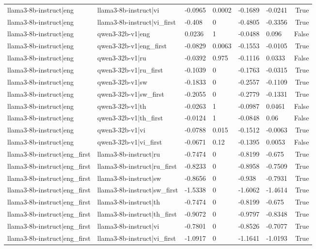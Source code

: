 \begin{table}
\begin{tabular}{llllllr}
llama3-8b-instruct|eng & llama3-8b-instruct|vi & -0.0965 & 0.0002 & -0.1689 & -0.0241 & True \\
llama3-8b-instruct|eng & llama3-8b-instruct|vi_first & -0.408 & 0 & -0.4805 & -0.3356 & True \\
llama3-8b-instruct|eng & qwen3-32b-v1|eng & 0.0236 & 1 & -0.0488 & 0.096 & False \\
llama3-8b-instruct|eng & qwen3-32b-v1|eng_first & -0.0829 & 0.0063 & -0.1553 & -0.0105 & True \\
llama3-8b-instruct|eng & qwen3-32b-v1|ru & -0.0392 & 0.975 & -0.1116 & 0.0333 & False \\
llama3-8b-instruct|eng & qwen3-32b-v1|ru_first & -0.1039 & 0 & -0.1763 & -0.0315 & True \\
llama3-8b-instruct|eng & qwen3-32b-v1|sw & -0.1833 & 0 & -0.2557 & -0.1109 & True \\
llama3-8b-instruct|eng & qwen3-32b-v1|sw_first & -0.2055 & 0 & -0.2779 & -0.1331 & True \\
llama3-8b-instruct|eng & qwen3-32b-v1|th & -0.0263 & 1 & -0.0987 & 0.0461 & False \\
llama3-8b-instruct|eng & qwen3-32b-v1|th_first & -0.0124 & 1 & -0.0848 & 0.06 & False \\
llama3-8b-instruct|eng & qwen3-32b-v1|vi & -0.0788 & 0.015 & -0.1512 & -0.0063 & True \\
llama3-8b-instruct|eng & qwen3-32b-v1|vi_first & -0.0671 & 0.12 & -0.1395 & 0.0053 & False \\
llama3-8b-instruct|eng_first & llama3-8b-instruct|ru & -0.7474 & 0 & -0.8199 & -0.675 & True \\
llama3-8b-instruct|eng_first & llama3-8b-instruct|ru_first & -0.8233 & 0 & -0.8958 & -0.7509 & True \\
llama3-8b-instruct|eng_first & llama3-8b-instruct|sw & -0.8656 & 0 & -0.938 & -0.7931 & True \\
llama3-8b-instruct|eng_first & llama3-8b-instruct|sw_first & -1.5338 & 0 & -1.6062 & -1.4614 & True \\
llama3-8b-instruct|eng_first & llama3-8b-instruct|th & -0.7474 & 0 & -0.8199 & -0.675 & True \\
llama3-8b-instruct|eng_first & llama3-8b-instruct|th_first & -0.9072 & 0 & -0.9797 & -0.8348 & True \\
llama3-8b-instruct|eng_first & llama3-8b-instruct|vi & -0.7801 & 0 & -0.8526 & -0.7077 & True \\
llama3-8b-instruct|eng_first & llama3-8b-instruct|vi_first & -1.0917 & 0 & -1.1641 & -1.0193 & True \\

\end{tabular}
\end{table}
